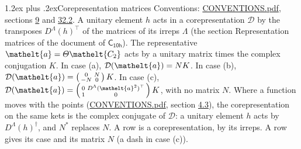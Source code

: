 \documentclass[10pt,a4paper]{article}
\makeatletter
\renewcommand\section{\@startsection{section}{1}{\z@}{-3ex plus -1ex minus -.2ex}%
  {1.2ex plus .2ex}{\normalfont\large\sffamily\bfseries\color{parttitle}}}
\numberwithin{equation}{section}
\newcommand{\eltfont}[1]{{\let\sigma\eltsigma\mathelt{#1}}}
\newcommand{\grp}[1]{\mathsf{#1}}
\newcommand{\elt}[1]{\eltfont{#1}}
\makeatother
\begin{document}
\section{Corepresentation matrices}\label{s:corep_matrices}
Conventions: \href{../../CONVENTIONS.pdf}{CONVENTIONS.pdf}, sections \href{../../../rotation/CONVENTIONS.pdf\#conv.9}{9} and \href{../../CONVENTIONS.pdf\#conv.32.2}{32.2}.
A unitary element $h$ acts in a corepresentation $\mathcal{D}$ by the transposes $D^{\Lambda}(h)^{\top}$ of the matrices of its irreps $\Lambda$ (the section Representation matrices of the document of \href{../../../rotation/data/pdf/C10h.pdf}{$\grp{C_{10h}}$}). The representative $\elt{a} = \varTheta\elt{C_{2}}$ acts by a unitary matrix times the complex conjugation $K$.
In case (a), $\mathcal{D}(\elt{a}) = NK$. In case (b), $\mathcal{D}(\elt{a}) = \left(\begin{smallmatrix} 0 & N \\ -N & 0 \end{smallmatrix}\right) K$. In case (c), $\mathcal{D}(\elt{a}) = \left(\begin{smallmatrix} 0 & D^{\Lambda}(\elt{a}^2)^{\top} \\ 1 & 0 \end{smallmatrix}\right) K$, with no matrix $N$.
Where a function moves with the points (\href{../../CONVENTIONS.pdf}{CONVENTIONS.pdf}, section \href{../../../rotation/CONVENTIONS.pdf\#conv.4.3}{4.3}), the corepresentation on the same kets is the complex conjugate of $\mathcal{D}$: a unitary element $h$ acts by $D^{\Lambda}(h)^{\dagger}$, and $N^{*}$ replaces $N$.
A row is a corepresentation, by its irreps. A row gives its case and its matrix $N$ (a dash in case (c)).
\end{document}
